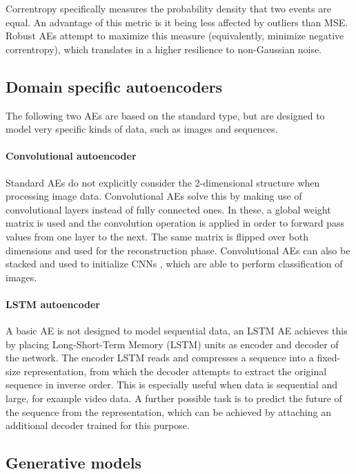 Correntropy specifically measures the probability density that two events are equal. An advantage of this metric is it being less affected by outliers than MSE. Robust AEs attempt to maximize this measure (equivalently, minimize negative correntropy), which translates in a higher resilience to non-Gaussian noise.

\subsection{Domain specific autoencoders}\label{p1Sec.DomainSpecific}

The following two AEs are based on the standard type, but are designed to model very specific kinds of data, such as images and sequences.

\paragraph{Convolutional autoencoder } Standard AEs do not explicitly consider the 2-dimensional structure when processing image data. Convolutional AEs solve this by making use of convolutional layers instead of fully connected ones. In these, a global weight matrix is used and the convolution operation is applied in order to forward pass values from one layer to the next. The same matrix is flipped over both dimensions and used for the reconstruction phase. Convolutional AEs can also be stacked and used to initialize CNNs , which are able to perform classification of images.


\paragraph{LSTM autoencoder } A basic AE is not designed to model sequential data, an LSTM AE achieves this by placing Long-Short-Term Memory (LSTM)  units as encoder and decoder of the network. The encoder LSTM reads and compresses a sequence into a fixed-size representation, from which the decoder attempts to extract the original sequence in inverse order. This is especially useful when data is sequential and large, for example video data. A further possible task is to predict the future of the sequence from the representation, which can be achieved by attaching an additional decoder trained for this purpose.


\subsection{Generative models}\label{p1Sec.Generative}

